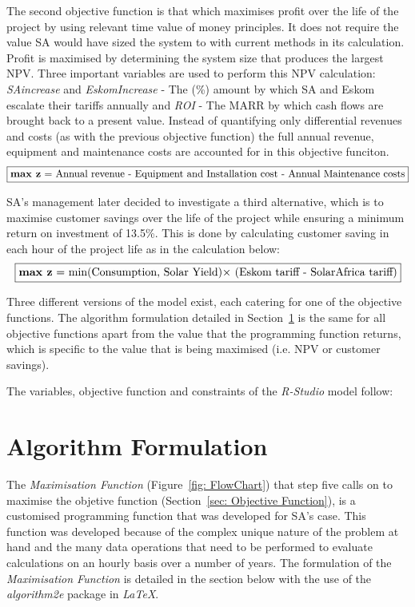\documentclass[a4paper,11pt,fleqn]{report}
\begin{document}
The second objective function is that which maximises profit over the life of the project by using relevant time value of money principles. It does not require the value \ac{SA} would have sized the system to with current methods in its calculation. Profit is maximised by determining the system size that produces the largest \ac{NPV}. Three important variables are used to perform this \ac{NPV} calculation: \textit{SAincrease} and \textit{EskomIncrease} - The (\%) amount by which \ac{SA} and Eskom escalate their tariffs annually and \textit{ROI} - The \ac{MARR} by which cash flows are brought back to a present value. Instead of quantifying only differential revenues and costs (as with the previous objective function) the full annual revenue, equipment and maintenance costs are accounted for in this objective funciton.
\begin{equation}
\boxed{$\textbf{max z} = \text{Annual revenue} - \text{Equipment and Installation cost} - \text{Annual Maintenance costs}$}\\
\end{equation}

\ac{SA}'s management later decided to investigate a third alternative, which is to maximise customer savings over the life of the project while ensuring a minimum return on investment of 13.5\%. This is done by calculating customer saving in each hour of the project life as in the calculation below:\\
\begin{equation}
\boxed{$\textbf{max z} = \text{min(Consumption, Solar Yield)}$\times$ (\text{Eskom tariff} - \text{SolarAfrica tariff})$}\\
\end{equation}

Three different versions of the model exist, each catering for one of the objective functions. The algorithm formulation detailed in Section~\ref{sec: Algorithm Formulation} is the same for all objective functions apart from the value that the programming function returns, which is specific to the value that is being maximised (i.e. \ac{NPV} or customer savings).

The variables, objective function and constraints of the \textit{R-Studio} model follow:\\

\section{Algorithm Formulation} \label{sec: Algorithm Formulation}
The \textit{Maximisation Function} (Figure~\ref{fig: FlowChart}) that step five calls on to maximise the objetive function (Section~\ref{sec: Objective Function}), is a customised programming function that was developed for \ac{SA}'s case. This function was developed because of the complex unique nature of the problem at hand and the many data operations that need to be performed to evaluate calculations on an hourly basis over a number of years. The formulation of the \textit{Maximisation Function} is detailed in the section below with the use of the \textit{algorithm2e} package in \textit{LaTeX}.
\end{document}

